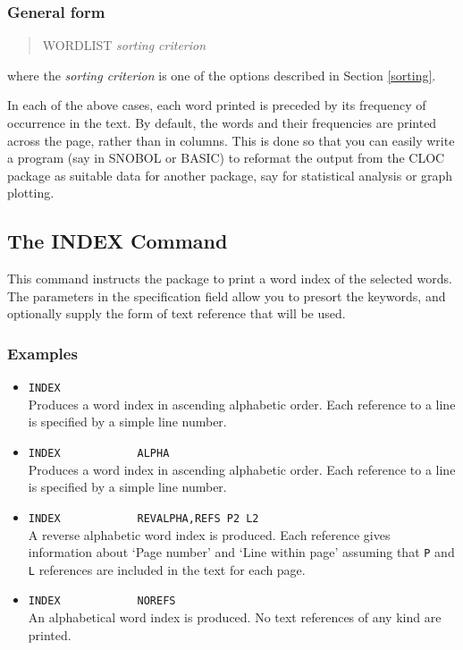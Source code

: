 \subsubsection{General form}
\begin{quote}
WORDLIST       {\em sorting criterion}
\end{quote}

where the {\em sorting criterion} is one of the options described
in Section \ref{sorting}.

In each of the above cases, each word printed is preceded by its
frequency of occurrence in the text. By default, the words and their
frequencies are printed across the page, rather than in columns. This
is done so that you can easily write
a program (say in SNOBOL or BASIC) to reformat the output from
the CLOC package as suitable data for another package, say for
statistical analysis or graph plotting.

\subsection{The INDEX Command}
This command instructs the package to print a word index
of the selected words.  The parameters in the specification
field allow you to presort the keywords, and optionally supply the form
of text reference that will be used.

\subsubsection{Examples}
\begin{itemize}
\item   \verb/INDEX/\\
    Produces a word index in ascending alphabetic order.
    Each reference to a line is specified by a simple line number.
\item   \verb/INDEX            ALPHA/\\
    Produces a word index in ascending alphabetic order.
    Each reference to a line is specified by a simple line number.
\item   \verb/INDEX            REVALPHA,REFS P2 L2/\\
    A reverse alphabetic word index is produced.
    Each reference gives information about `Page number' and `Line
    within page' assuming that \verb/P/ and \verb/L/ references are included in
    the text for each page.
\item   \verb/INDEX            NOREFS/\\
    An alphabetical word index is produced.
    No text references of any kind are printed.
\end{itemize}

